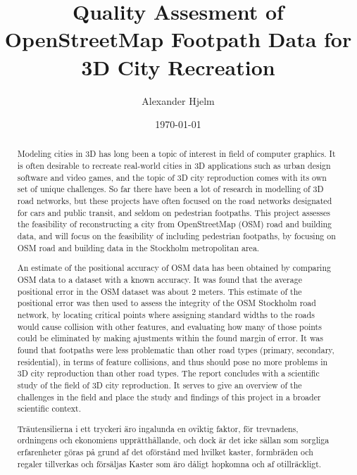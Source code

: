 \documentclass{kththesis}
\title{Quality Assesment of OpenStreetMap Footpath Data for 3D City Recreation}
\author{Alexander Hjelm}
\date{\today}
\begin{document}
\frontmatter

\titlepage

\begin{abstract}
Modeling cities in 3D has long been a topic of interest in field of computer graphics.
It is often desirable to recreate real-world cities in 3D applications such as urban design software and video games, and the topic of 3D city reproduction comes with its own set of unique challenges.
So far there have been a lot of research in modelling of 3D road networks, but these projects have often focused on the road networks designated for cars and public transit, and seldom on pedestrian footpaths.
This project assesses the feasibility of reconstructing a city from OpenStreetMap (OSM) road and building data, and will focus on the feasibility of including pedestrian footpaths, by focusing on OSM road and building data in the Stockholm metropolitan area.

An estimate of the positional accuracy of OSM data has been obtained by comparing OSM data to a dataset with a known accuracy.
It was found that the average positional error in the OSM dataset was about 2 meters.
This estimate of the positional error was then used to assess the integrity of the OSM Stockholm road network, by locating critical points where assigning standard widths to the roads would cause collision with other features, and evaluating how many of those points could be eliminated by making ajustments within the found margin of error.
It was found that footpaths were less problematic than other road types (primary, secondary, residential), in terms of feature collisions, and thus should pose no more problems in 3D city reproduction than other road types.
The report concludes with a scientific study of the field of 3D city reproduction. It serves to give an overview of the challenges in the field and place the study and findings of this project in a broader scientific context. 
\end{abstract}

\begin{otherlanguage}{swedish}
  \begin{abstract}
    Träutensilierna i ett tryckeri äro ingalunda en oviktig faktor,
    för trevnadens, ordningens och ekonomiens upprätthållande, och
    dock är det icke sällan som sorgliga erfarenheter göras på grund
    af det oförstånd med hvilket kaster, formbräden och regaler
    tillverkas och försäljas Kaster som äro dåligt hopkomna och af
    otillräckligt.
  \end{abstract}
\end{otherlanguage}
\end{document}
